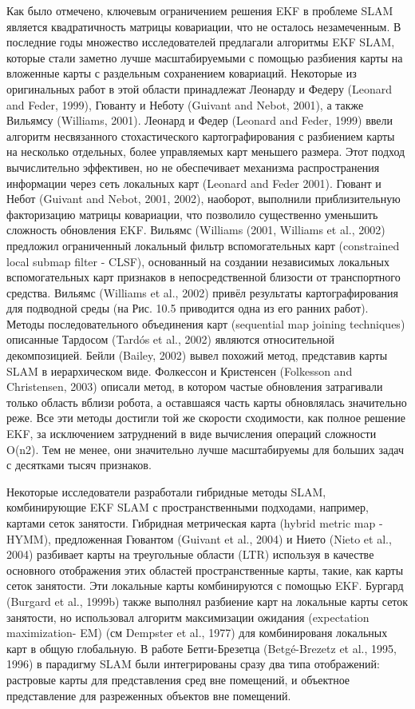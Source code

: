 \documentclass[10pt,a4paper]{article}
\begin{document}
Как было отмечено, ключевым ограничением решения EKF в проблеме SLAM является квадратичность матрицы ковариации, что не осталось незамеченным. В последние годы множество исследователей предлагали алгоритмы EKF SLAM, которые стали заметно лучше масштабируемыми с помощью разбиения карты на вложенные карты с раздельным сохранением ковариаций. Некоторые из оригинальных работ в этой области принадлежат Леонарду и Федеру (Leonard and Feder, 1999), Гюванту и Неботу (Guivant and Nebot, 2001), а также Вильямсу (Williams, 2001). Леонард и Федер (Leonard and Feder, 1999) ввели алгоритм несвязанного стохастического картографирования с разбиением карты на несколько отдельных, более управляемых карт меньшего размера. Этот подход вычислительно эффективен, но не обеспечивает механизма распространения информации через сеть локальных карт (Leonard and Feder 2001). Гювант и Небот (Guivant and Nebot, 2001, 2002), наоборот, выполнили приблизительную факторизацию матрицы ковариации, что позволило существенно уменьшить сложность обновления EKF. Вильямс (Williams (2001, Williams et al., 2002) предложил ограниченный локальный фильтр вспомогательных карт (constrained local submap filter - CLSF), основанный на создании независимых локальных вспомогательных карт признаков в непосредственной близости от транспортного средства. Вильямс (Williams et al., 2002) привёл результаты картографирования для подводной среды (на Рис. 10.5 приводится одна из его ранних работ). Методы последовательного объединения карт (sequential  map joining techniques) описанные Тардосом (Tardós et al., 2002) являются относительной декомпозицией. Бейли (Bailey, 2002) вывел похожий метод, представив карты SLAM в иерархическом виде. Фолкессон и Кристенсен (Folkesson and Christensen, 2003) описали метод, в котором частые обновления затрагивали только область вблизи робота, а оставшаяся часть карты обновлялась значительно реже. Все эти методы достигли той же скорости сходимости, как полное решение EKF, за исключением затруднений в виде вычисления операций сложности O(n2). Тем не менее, они значительно лучше масштабируемы для больших задач с десятками тысяч признаков.

Некоторые исследователи разработали гибридные методы SLAM, комбинирующие EKF SLAM с пространственными подходами, например, картами сеток занятости. Гибридная метрическая карта (hybrid metric map -HYMM), предложенная Гювантом (Guivant et al., 2004) и Нието (Nieto et al., 2004) разбивает карты на треугольные области (LTR) используя в качестве основного отображения этих областей пространственные карты, такие, как карты сеток занятости. Эти локальные карты комбинируются с помощью EKF. Бургард (Burgard et al., 1999b) также выполнял разбиение карт на локальные карты сеток занятости, но использовал алгоритм максимизации ожидания (expectation maximization- EM) (см Dempster et al., 1977) для комбинированя локальных карт в общую глобальную. В работе Бетги-Брезетца (Betgé-Brezetz et al., 1995, 1996) в парадигму SLAM были интегрированы сразу два типа отображений: растровые карты для представления сред вне помещений, и объектное представление для разреженных объектов вне помещений.
\end{document}
